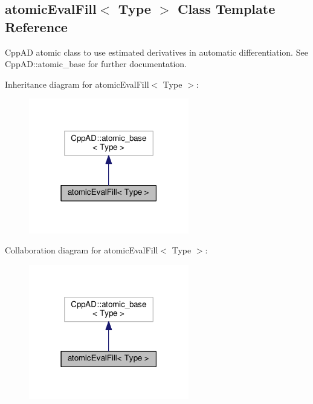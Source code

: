 \hypertarget{classatomicEvalFill}{}\subsection{atomic\+Eval\+Fill$<$ Type $>$ Class Template Reference}
\label{classatomicEvalFill}


Cpp\+A\+D atomic class to use estimated derivatives in automatic differentiation. See Cpp\+A\+D\+::atomic\+\_\+base for further documentation.  




Inheritance diagram for atomic\+Eval\+Fill$<$ Type $>$\+:\nopagebreak
\begin{figure}[H]
\begin{center}
\leavevmode
\includegraphics[width=198pt]{classatomicEvalFill__inherit__graph}
\end{center}
\end{figure}


Collaboration diagram for atomic\+Eval\+Fill$<$ Type $>$\+:\nopagebreak
\begin{figure}[H]
\begin{center}
\leavevmode
\includegraphics[width=198pt]{classatomicEvalFill__coll__graph}
\end{center}
\end{figure}
